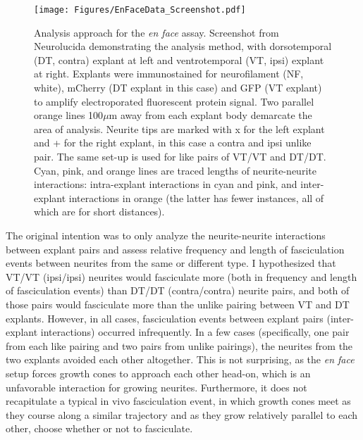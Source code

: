 \begin{figure}[hbtp]
    \begin{center}
        \texttt{[image: Figures/EnFaceData\_Screenshot.pdf]}
        \caption[Analysis approach for the \emph{en face} assay.]
        {Analysis approach for the \emph{en face} assay.
        Screenshot from Neurolucida demonstrating the analysis method, with dorsotemporal (DT, contra) explant at left and ventrotemporal (VT, ipsi) explant at right.
        Explants were immunostained for neurofilament (NF, white), mCherry (DT explant in this case) and GFP (VT explant) to amplify electroporated fluorescent protein signal.
        Two parallel orange lines 100$\mu$m away from each explant body demarcate the area of analysis.
        Neurite tips are marked with x for the left explant and + for the right explant, in this case a contra and ipsi unlike pair.
        The same set-up is used for like pairs of VT/VT and DT/DT.
        Cyan, pink, and orange lines are traced lengths of neurite-neurite interactions: intra-explant interactions in cyan and pink, and inter-explant interactions in orange (the latter has fewer instances, all of which are for short distances).}
        \label{EnFaceDataScreenshot}
    \end{center}
\end{figure}

The original intention was to only analyze the neurite-neurite interactions between explant pairs and assess relative frequency and length of fasciculation events between neurites from the same or different type.
I hypothesized that VT/VT (ipsi/ipsi) neurites would fasciculate more (both in frequency and length of fasciculation events) than DT/DT (contra/contra) neurite pairs, and both of those pairs would fasciculate more than the unlike pairing between VT and DT explants.
However, in all cases, fasciculation events between explant pairs (inter-explant interactions) occurred infrequently.
In a few cases (specifically, one pair from each like pairing and two pairs from unlike pairings), the neurites from the two explants avoided each other altogether.
This is not surprising, as the \emph{en face} setup forces growth cones to approach each other head-on, which is an unfavorable interaction for growing neurites.
Furthermore, it does not recapitulate a typical in vivo fasciculation event, in which growth cones meet as they course along a similar trajectory and as they grow relatively parallel to each other, choose whether or not to fasciculate.

